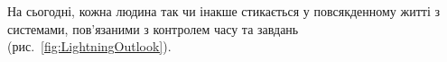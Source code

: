 На сьогодні, кожна людина так чи інакше стикається у повсякденному житті з системами, пов'язаними з контролем часу та завдань (рис.~\ref{fig:LightningOutlook}).


